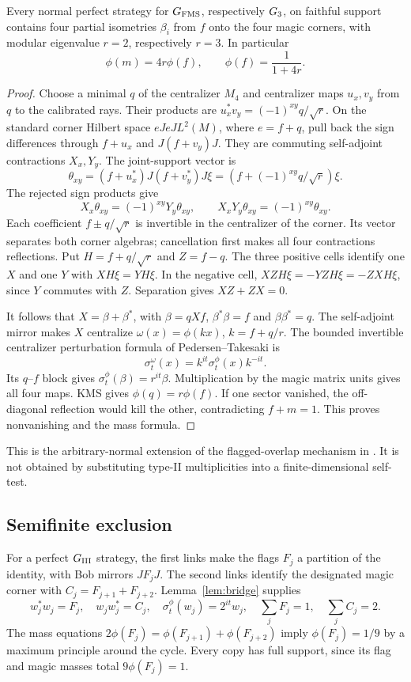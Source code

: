 \begin{lemma}\label{lem:bridge}
Every normal perfect strategy for $G_{\mathrm{FMS}}$, respectively $G_3$, on faithful support contains four partial isometries $\beta_i$ from $f$ onto the four magic corners, with modular eigenvalue $r=2$, respectively $r=3$. In particular
\[
 \phi(m)=4r\phi(f),\qquad \phi(f)=\frac1{1+4r}.
\]
\end{lemma}
\begin{proof}
Choose a minimal $q$ of the centralizer $M_4$ and centralizer maps $u_x,v_y$ from $q$ to the calibrated rays. Their products are $u_x^*v_y=(-1)^{xy}q/\sqrt r$. On the standard corner Hilbert space $eJeJ L^2(M)$, where $e=f+q$, pull back the sign differences through $f+u_x$ and $J(f+v_y)J$. They are commuting self-adjoint contractions $X_x,Y_y$. The joint-support vector is
\[
 \theta_{xy}=(f+u_x^*)J(f+v_y^*)J\xi
             =(f+(-1)^{xy}q/\sqrt r)\xi.
\]
The rejected sign products give
\[
 X_x\theta_{xy}=(-1)^{xy}Y_y\theta_{xy},\qquad
 X_xY_y\theta_{xy}=(-1)^{xy}\theta_{xy}.
\]
Each coefficient $f\pm q/\sqrt r$ is invertible in the centralizer of the corner. Its vector separates both corner algebras; cancellation first makes all four contractions reflections. Put $H=f+q/\sqrt r$ and $Z=f-q$. The three positive cells identify one $X$ and one $Y$ with $XH\xi=YH\xi$. In the negative cell, $XZH\xi=-YZH\xi=-ZXH\xi$, since $Y$ commutes with $Z$. Separation gives $XZ+ZX=0$.

It follows that $X=\beta+\beta^*$, with $\beta=qXf$, $\beta^*\beta=f$ and $\beta\beta^*=q$. The self-adjoint mirror makes $X$ centralize $\omega(x)=\phi(kx)$, $k=f+q/r$. The bounded invertible centralizer perturbation formula of Pedersen--Takesaki \cite[Lemma 4.5]{PT} is
\[
 \sigma_t^\omega(x)=k^{it}\sigma_t^\phi(x)k^{-it}.
\]
Its $q$--$f$ block gives $\sigma_t^\phi(\beta)=r^{it}\beta$. Multiplication by the magic matrix units gives all four maps. KMS gives $\phi(q)=r\phi(f)$. If one sector vanished, the off-diagonal reflection would kill the other, contradicting $f+m=1$. This proves nonvanishing and the mass formula.
\end{proof}
This is the arbitrary-normal extension of the flagged-overlap mechanism in \cite[Appendix C]{FMS}. It is not obtained by substituting type-II multiplicities into a finite-dimensional self-test.

\subsection{Semifinite exclusion}
For a perfect $G_{\mathrm{III}}$ strategy, the first links make the flags $F_j$ a partition of the identity, with Bob mirrors $JF_jJ$. The second links identify the designated magic corner with $C_j=F_{j+1}+F_{j+2}$. Lemma~\ref{lem:bridge} supplies
\begin{equation}\label{eq:ck}
 w_j^*w_j=F_j,\quad w_jw_j^*=C_j,\quad
 \sigma_t^\phi(w_j)=2^{it}w_j,\quad
 \sum_jF_j=1,\quad\sum_jC_j=2.
\end{equation}
The mass equations $2\phi(F_j)=\phi(F_{j+1})+\phi(F_{j+2})$ imply $\phi(F_j)=1/9$ by a maximum principle around the cycle. Every copy has full support, since its flag and magic masses total $9\phi(F_j)=1$.

